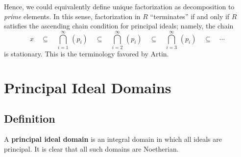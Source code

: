 \documentclass[11pt]{article}
\begin{document}
Hence, we could equivalently define unique factorization as decomposition to \textit{prime} elements. In this sense, factorization in $R$ ``terminates'' if and only if $R$ satisfies the ascending chain condition for principal ideals; namely, the chain
\[
  x \quad \subseteq \quad \bigcap\limits_{i = 1}^{\infty} \, (p_{i}) \quad \subseteq \quad \bigcap\limits_{i = 2}^{\infty} \, (p_{i}) \quad \subseteq \quad \bigcap\limits_{i = 3}^{\infty} \, (p_{i}) \quad \subseteq \quad \cdots
\]
is stationary. This is the terminology favored by Artin.


\section{Principal Ideal Domains}


\subsection{Definition}

A \textbf{principal ideal domain} is an integral domain in which all ideals are principal. It is clear that all such domains are Noetherian.

\newpage
\end{document}
